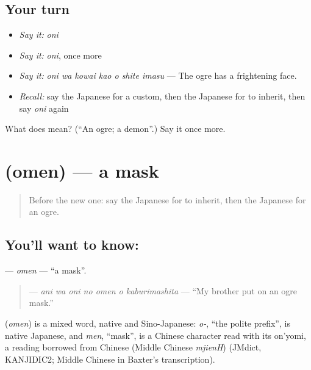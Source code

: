 \subsection*{Your turn}
\begin{itemize}
\raggedright
  \item \emph{Say it:} \emph{oni}
  \item \emph{Say it:} \emph{oni}, once more
  \item \emph{Say it:} \emph{oni wa kowai kao o shite imasu} — The ogre has a frightening face.
  \item \emph{Recall:} say the Japanese for a custom, then the Japanese for to inherit, then say \emph{oni} again
\end{itemize}

\begin{tcolorbox}[breakable,colback=teal!4,colframe=teal!35!black,title={Before you move on}]
What does  mean? (\textquotedblleft{}An ogre; a demon\textquotedblright{}.) Say it once more.
\end{tcolorbox}
\section[\texorpdfstring{\ja{おめん} (omen)}{おめん (omen)}]{ (omen) — a mask}

\label{lesson:JA-C297-omen}



\begin{quote}
Before the new one: say the Japanese for to inherit, then the Japanese for an ogre.
\end{quote}

\subsection*{You'll want to know: }
\textbf{} — \emph{omen} — \textquotedblleft{}a mask\textquotedblright{}.

\begin{quote}
\textbf{   } — \emph{ani wa oni no omen o kaburimashita} — \textquotedblleft{}My brother put on an ogre mask.\textquotedblright{}
\end{quote}

\begin{cousinweb}
\textbf{} (\emph{omen}) is a mixed word, native and Sino-Japanese: \emph{o-}, \textquotedblleft{}the polite prefix\textquotedblright{}, is native Japanese, and \emph{men}, \textquotedblleft{}mask\textquotedblright{}, is a Chinese character read with its on'yomi, a reading borrowed from Chinese (Middle Chinese \emph{mjienH}) (JMdict, KANJIDIC2; Middle Chinese in Baxter's transcription).
\end{cousinweb}

